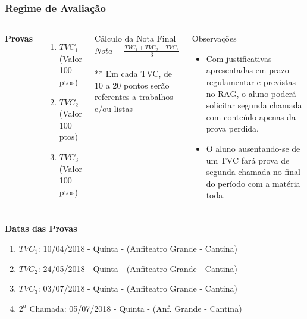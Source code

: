 \documentclass{beamer}
\begin{document}
\begin{frame}
\frametitle{Regime de Avaliação}
\begin{columns}[c] %

\textbf{Provas}
\begin{enumerate}
\item $TVC_1$ (Valor 100 ptos)
\item $TVC_2$ (Valor 100 ptos)
\item $TVC_3$ (Valor 100 ptos)
\end{enumerate} 

\begin{block}{Cálculo da Nota Final}
$Nota = \frac{TVC_1+TVC_2+TVC_3}{3}$ \\~\\

** Em cada TVC, de 10 a 20 pontos serão referentes a trabalhos e/ou listas

\end{block}


\begin{block}{Observações}
\begin{itemize}

\item Com justificativas apresentadas em prazo regulamentar e previstas no RAG, o aluno poderá solicitar segunda chamada com conteúdo apenas da prova perdida.
\item O aluno ausentando-se de um TVC fará prova de segunda chamada no final do período com a matéria toda.
\end{itemize}
\end{block}

\end{columns}

\end{frame}

\begin{frame}
	\textbf{Datas das Provas}
	\begin{enumerate}
		\item $TVC_1$: 10/04/2018 - Quinta - (Anfiteatro Grande - Cantina)
		\item $TVC_2$: 24/05/2018 - Quinta - (Anfiteatro Grande - Cantina)
		\item $TVC_3$: 03/07/2018 - Quinta - (Anfiteatro Grande - Cantina)
		\item $2^a$ Chamada: 05/07/2018 - Quinta - (Anf. Grande - Cantina)
	\end{enumerate}
\end{frame}
\end{document}
